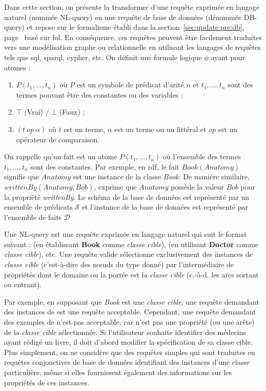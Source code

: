 Dans cette section, on présente la transformer d'une requête exprimée en langage naturel (nommée NL-query) en une requête de base de données (dénommée DB-query) \cite{amaviNaturalLanguageQuerying2020} et repose sur le formalisme établi dans la section~\ref{sec:update:pre:db}, page~\pageref{sec:update:pre:db} basé sur \gls{fol}.
En conséquence, ces requêtes peuvent être facilement traduites vers une modélisation graphe ou relationnelle en utilisant les langages de requêtes tels que \gls{sql}, \gls{sparql}, \gls{cypher}, etc.
On définit une formule logique $\phi$ ayant pour atomes :
\begin{enumerate}
    \item $P(t_1, \dots, t_n)$ où $P$ est un symbole de prédicat d'arité $n$ et $t_1, \dots, t_n$ sont des termes pouvant être des constantes ou des variables ;
    \item $\top$ (Vrai) / $\bot$ (Faux) ;
    \item $(t\ op\ \alpha)$ où $t$ est un terme, $\alpha$ est un terme ou un littéral et $op$ est un opérateur de comparaison.
\end{enumerate}
On rappelle qu'un fait est un atome $P(t_1, \dots, t_n)$ où l'ensemble des termes $t_1, \dots, t_n$ sont des constantes.
Par exemple, en \gls{rdf}, le fait $Book(Anatomy)$ signifie que $Anatomy$ est une instance de la classe \emph{Book}.
De manière similaire, $writtenBy(Anatomy, Bob)$, exprime que $Anatomy$ possède la valeur $Bob$ pour la propriété \textit{writtenBy}.
Le schéma de la base de données est représenté par un ensemble de prédicats $\mathcal{S}$ et l'instance de la base de données est représenté par l'ensemble de faits $\mathcal{D}$

\begin{definition}[NL-query]
    Une NL-query est une requête exprimée en langage naturel qui suit le format suivant :  (en établissant \textbf{Book} comme \emph{classe cible}),  (en utilisant \textbf{Doctor} comme \emph{classe cible}), etc.
    Une requête valide sélectionne exclusivement des instances de  \emph{classe cible} (c'est-à-dire des nœuds du type donné) par l'intermédiaire de propriétés dont le domaine ou la portée est la \emph{classe cible} (c.-à-d. les arcs sortant ou entrant).
\end{definition}

Par exemple, en supposant que \emph{Book} est une \emph{classe cible}, une requête demandant des instances de  est une requête acceptable.
Cependant, une requête demandant des exemples de  n'est pas acceptable, car  n'est pas une propriété (ou une arête) de la \emph{classe cible} sélectionnée.
Si l'utilisateur souhaite identifier des médecins ayant rédigé un livre, il doit d'abord modifier la spécification de sa classe cible.
Plus simplement, on ne considère que des requêtes simples qui sont traduites en requêtes conjonctives de base de données identifiant des instances d'une classe particulière, même si elles fournissent également des informations sur les propriétés de ces instances.

